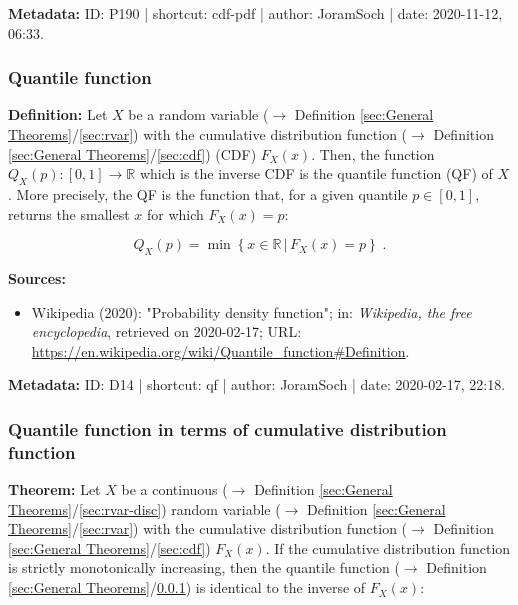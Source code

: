 \documentclass[a4paper,12pt,twoside]{book}
\begin{document}
\vspace{1em}
\textbf{Metadata:} ID: P190 | shortcut: cdf-pdf | author: JoramSoch | date: 2020-11-12, 06:33.
\vspace{1em}



\subsubsection[\textit{Quantile function}]{Quantile function} \label{sec:qf}
\setcounter{equation}{0}

\textbf{Definition:} Let $X$ be a random variable ($\rightarrow$ Definition \ref{sec:General Theorems}/\ref{sec:rvar}) with the cumulative distribution function ($\rightarrow$ Definition \ref{sec:General Theorems}/\ref{sec:cdf}) (CDF) $F_X(x)$. Then, the function $Q_X(p): [0,1] \to \mathbb{R}$ which is the inverse CDF is the quantile function (QF) of $X$. More precisely, the QF is the function that, for a given quantile $p \in [0,1]$, returns the smallest $x$ for which $F_X(x) = p$:

\begin{equation} \label{eq:qf-qf}
Q_X(p) = \min \left\lbrace x \in \mathbb{R} \, \vert \, F_X(x) = p \right\rbrace \; .
\end{equation}


\vspace{1em}
\textbf{Sources:}
\begin{itemize}
\item Wikipedia (2020): "Probability density function"; in: \textit{Wikipedia, the free encyclopedia}, retrieved on 2020-02-17; URL: \url{https://en.wikipedia.org/wiki/Quantile_function#Definition}.
\end{itemize}


\vspace{1em}
\textbf{Metadata:} ID: D14 | shortcut: qf | author: JoramSoch | date: 2020-02-17, 22:18.
\vspace{1em}



\subsubsection[\textbf{Quantile function in terms of cumulative distribution function}]{Quantile function in terms of cumulative distribution function} \label{sec:qf-cdf}
\setcounter{equation}{0}

\textbf{Theorem:} Let $X$ be a continuous ($\rightarrow$ Definition \ref{sec:General Theorems}/\ref{sec:rvar-disc}) random variable ($\rightarrow$ Definition \ref{sec:General Theorems}/\ref{sec:rvar}) with the cumulative distribution function ($\rightarrow$ Definition \ref{sec:General Theorems}/\ref{sec:cdf}) $F_X(x)$. If the cumulative distribution function is strictly monotonically increasing, then the quantile function ($\rightarrow$ Definition \ref{sec:General Theorems}/\ref{sec:qf})  is identical to the inverse of $F_X(x)$:
\end{document}
